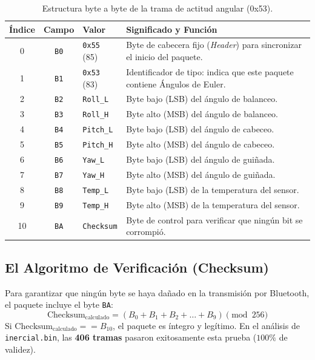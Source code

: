\documentclass[12pt,letterpaper]{article}
\begin{document}
\begin{table}[H]
\centering
\caption{Estructura byte a byte de la trama de actitud angular (0x53).}
\label{tab:trama}
\begin{tabular}{cclp{7.5cm}}
\toprule
\textbf{Índice} & \textbf{Campo} & \textbf{Valor} & \textbf{Significado y Función} \\
\midrule
0 & \texttt{B0} & \texttt{0x55} (85) & Byte de cabecera fijo (\textit{Header}) para sincronizar el inicio del paquete. \\
1 & \texttt{B1} & \texttt{0x53} (83) & Identificador de tipo: indica que este paquete contiene Ángulos de Euler. \\
2 & \texttt{B2} & \texttt{Roll\_L} & Byte bajo (LSB) del ángulo de balanceo. \\
3 & \texttt{B3} & \texttt{Roll\_H} & Byte alto (MSB) del ángulo de balanceo. \\
4 & \texttt{B4} & \texttt{Pitch\_L} & Byte bajo (LSB) del ángulo de cabeceo. \\
5 & \texttt{B5} & \texttt{Pitch\_H} & Byte alto (MSB) del ángulo de cabeceo. \\
6 & \texttt{B6} & \texttt{Yaw\_L} & Byte bajo (LSB) del ángulo de guiñada. \\
7 & \texttt{B7} & \texttt{Yaw\_H} & Byte alto (MSB) del ángulo de guiñada. \\
8 & \texttt{B8} & \texttt{Temp\_L} & Byte bajo (LSB) de la temperatura del sensor. \\
9 & \texttt{B9} & \texttt{Temp\_H} & Byte alto (MSB) de la temperatura del sensor. \\
10 & \texttt{BA} & \texttt{Checksum} & Byte de control para verificar que ningún bit se corrompió. \\
\bottomrule
\end{tabular}
\end{table}

\subsection{El Algoritmo de Verificación (Checksum)}
Para garantizar que ningún byte se haya dañado en la transmisión por Bluetooth, el paquete incluye el byte \texttt{BA}:
\begin{equation}
\text{Checksum}_{\text{calculado}} = \left( B_0 + B_1 + B_2 + \dots + B_9 \right) \pmod{256}
\end{equation}
Si $\text{Checksum}_{\text{calculado}} == B_{10}$, el paquete es íntegro y legítimo. En el análisis de \texttt{inercial.bin}, las \textbf{406 tramas} pasaron exitosamente esta prueba ($100\%$ de validez).
\end{document}
